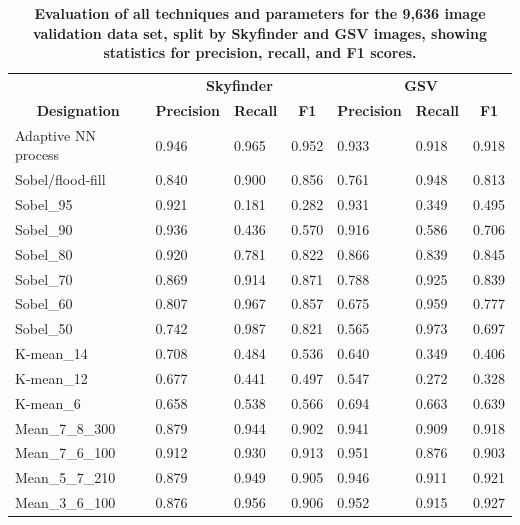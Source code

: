 \documentclass[final,3p,times,authoryear]{elsarticle}
\begin{document}
\begin{table}[!htbp]
\caption{\bf Evaluation of all techniques and parameters for the 9,636 image validation data set, split by Skyfinder and GSV images, showing statistics for precision, recall, and F1 scores. \label{tab:precision}}     
\begin{tabular}{ l l l l l l l }
\multicolumn{1}{c}{\textbf{~}}
& \multicolumn{3}{c}{\textbf{Skyfinder}}
& \multicolumn{3}{c}{\textbf{GSV}}
\\ 
 \multicolumn{1}{c|}{\textbf{Designation}}
& \textbf{Precision} 
& \textbf{Recall} 
& \multicolumn{1}{c|}{\textbf{F1}}
& \textbf{Precision} 
& \textbf{Recall}  
& \multicolumn{1}{c}{\textbf{F1}}
\\ \hline
Adaptive NN process&0.946&0.965&0.952&0.933&0.918&0.918 \\
\hline
Sobel/flood-fill&0.840&0.900&0.856&0.761&0.948&0.813 \\
\hline
Sobel\_95       &0.921&0.181&0.282&0.931&0.349&0.495\\
Sobel\_90       &0.936&0.436&0.570&0.916&0.586&0.706\\
Sobel\_80       &0.920&0.781&0.822&0.866&0.839&0.845\\
Sobel\_70       &0.869&0.914&0.871&0.788&0.925&0.839\\
Sobel\_60       &0.807&0.967&0.857&0.675&0.959&0.777\\
Sobel\_50       &0.742&0.987&0.821&0.565&0.973&0.697\\
K-mean\_14      &0.708&0.484&0.536&0.640&0.349&0.406\\
K-mean\_12      &0.677&0.441&0.497&0.547&0.272&0.328\\
K-mean\_6       &0.658&0.538&0.566&0.694&0.663&0.639\\
Mean\_7\_8\_300 &0.879&0.944&0.902&0.941&0.909&0.918\\
Mean\_7\_6\_100	&0.912&0.930&0.913&0.951&0.876&0.903\\
Mean\_5\_7\_210	&0.879&0.949&0.905&0.946&0.911&0.921\\
Mean\_3\_6\_100	&0.876&0.956&0.906&0.952&0.915&0.927\\
\hline
\end{tabular}
\end{table}
\end{document}

